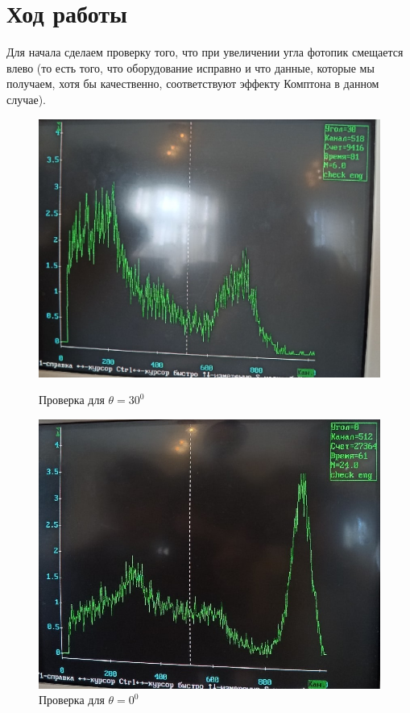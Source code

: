 \documentclass[a4paper, 12pt]{article}%
\begin{document}
\section{Ход работы}
Для начала сделаем проверку того, что при увеличении угла фотопик смещается влево (то есть того, что оборудование исправно и что данные, которые мы получаем, хотя бы качественно, соответствуют эффекту Комптона в данном случае).
\begin{figure}[h]
\begin{center}
\begin{minipage}[h]{0.4\linewidth}
\includegraphics[width=1\linewidth]{2.jpg}
\caption{Проверка для $\theta = 30^0$} 
\end{minipage}
\hfill
\begin{minipage}[h]{0.45\linewidth}
\includegraphics[width=1\linewidth]{3.jpg}
\caption{Проверка для $\theta = 0^0$} 
\end{minipage}
\end{center}
\end{figure}
\end{document}
